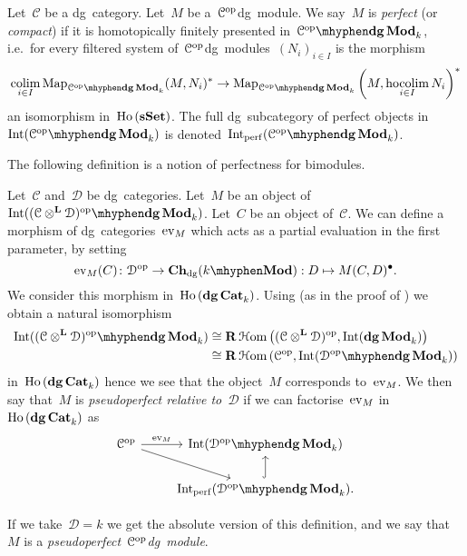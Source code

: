 \begin{refsection}
\begin{definition}
  Let~$\mathcal{C}$ be a dg~category. Let~$M$ be a~$\mathcal{C}^{\mathrm{op}}$\dash dg~module. We say~$M$ is \emph{perfect} (or \emph{compact}) if it is homotopically finitely presented in~$\dgMod{\mathcal{C}^\opp}_k$, i.e.\ for every filtered system of~$\mathcal{C}^{\mathrm{op}}$\dash dg~modules~$(N_i)_{i\in I}$ is the morphism
  \begin{equation}
    \colim_{i\in I}\Map_{\dgMod{\mathcal{C}^\opp}_k}(M,N_i)^*\to\Map_{\dgMod{\mathcal{C}^\opp}_k}\left( M,\hocolim_{i\in I}N_i \right)^*
  \end{equation}
  an isomorphism in~$\operatorname{\mathrm{Ho} \,}(\mathbf{s\,\!\mathbf{Set}})$. The full dg~subcategory of perfect objects in~$\Int(\dgMod{\mathcal{C}^\opp}_k)$ is denoted~$\Int_\perf(\dgMod{\mathcal{C}^\opp}_k)$.
\end{definition}
The following definition is a notion of perfectness for bimodules.
\begin{definition}
  Let~$\mathcal{C}$ and~$\mathcal{D}$ be dg~categories. Let~$M$ be an object of~$\Int(\dgMod{(\mathcal{C}\otimes^{\mathbf{L}}\mathcal{D})^\opp}_k)$. Let~$C$ be an object of~$\mathcal{C}$. We can define a morphism of dg~categories~$\operatorname{ev}_M$ which acts as a partial evaluation in the first parameter, by setting
  \begin{equation}
    \ev_M(C)\colon\mathcal{D}^\opp\to\Ch_\dg(k\mhyphen\Mod):D\mapsto M(C,D)^\bullet.
  \end{equation}
  We consider this morphism in~$\operatorname{\mathrm{Ho} \,}(\mathbf{dg\,Cat}_k)$. Using \cite[theorem 6.1]{toen} (as in the proof of \cite[corollary 7.6]{toen}) we obtain a natural isomorphism
  \begin{equation}
    \begin{aligned}
      \Int(\dgMod{(\mathcal{C}\otimes^{\mathbf{L}}\mathcal{D})^\opp}_k)&\cong\RRRHHom\left( (\mathcal{C}\otimes^{\mathbf{L}}\mathcal{D})^\opp,\Int(\dgMod_k) \right) \\
      &\cong\RRRHHom\left( \mathcal{C}^\opp,\Int(\dgMod{\mathcal{D}^\opp}_k) \right)
    \end{aligned}
  \end{equation}
  in~$\operatorname{\mathrm{Ho} \,}(\mathbf{dg\,Cat}_k)$ hence we see that the object~$M$ corresponds to~$\operatorname{ev}_M$. We then say that~$M$ is \emph{pseudoperfect relative to~$\mathcal{D}$} if we can factorise~$\operatorname{ev}_M$ in~$\operatorname{\mathrm{Ho} \,}(\mathbf{dg\,Cat}_k)$ as
  \begin{equation}
    \begin{tikzcd}
      \mathcal{C}^\opp \arrow{r}{\ev_M} \arrow{rd} & \Int(\dgMod{\mathcal{D}^\opp}_k) \\
      & \Int_\perf(\dgMod{\mathcal{D}^\opp}_k) \arrow[hook]{u}.
    \end{tikzcd}
  \end{equation}
\end{definition}
If we take~$\mathcal{D}=k$ we get the absolute version of this definition, and we say that $M$ is a \emph{pseudoperfect~$\mathcal{C}^{\mathrm{op}}$\dash dg~module}.


\end{refsection}
